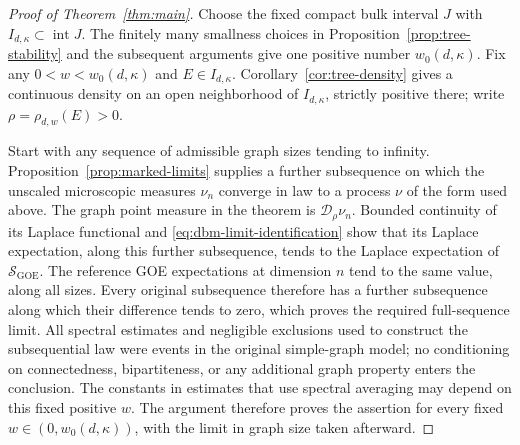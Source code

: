 \begin{proof}[Proof of Theorem~\ref{thm:main}]
Choose the fixed compact bulk interval \(J\) with
\(I_{d,\kappa}\subset\operatorname{int}J\).
The finitely many smallness choices in Proposition~\ref{prop:tree-stability}
and the subsequent arguments give one positive number \(w_0(d,\kappa)\).
Fix any \(0<w<w_0(d,\kappa)\) and \(E\in I_{d,\kappa}\).
Corollary~\ref{cor:tree-density} gives a continuous density on an open
neighborhood of \(I_{d,\kappa}\), strictly positive there; write
\(\rho=\rho_{d,w}(E)>0\).

Start with any sequence of admissible graph sizes tending to
infinity. Proposition~\ref{prop:marked-limits} supplies a further
subsequence on which the unscaled microscopic measures
\(\nu_n\) converge in law to a process \(\nu\) of the form used above.
The graph point measure in the theorem is
\(\mathcal D_\rho\nu_n\). Bounded continuity of its Laplace
functional and \eqref{eq:dbm-limit-identification} show that its
Laplace expectation, along this further subsequence, tends to the
Laplace expectation of \(\mathcal S_{\mathrm{GOE}}\).
The reference GOE expectations at dimension \(n\) tend to the same
value, along all sizes. Every original subsequence therefore has a
further subsequence along which their difference tends to zero,
which proves the required full-sequence limit. All spectral
estimates and negligible exclusions used to construct the
subsequential law were events in the original simple-graph model;
no conditioning on connectedness, bipartiteness, or any additional
graph property enters the conclusion. The constants in estimates that
use spectral averaging may depend on this fixed positive \(w\).
The argument therefore proves the assertion for every fixed
\(w\in(0,w_0(d,\kappa))\), with the limit in graph size taken afterward.
\end{proof}
